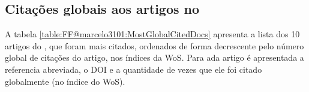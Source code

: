 

\subsection{Citações globais aos artigos no \dataset}

A tabela \ref{table:FF@marcelo3101:MostGlobalCitedDocs} apresenta a lista dos 10 artigos do \dataset, que foram mais citados, ordenados de forma decrescente pelo número global de citações do artigo, nos índices da WoS. Para ada artigo é apresentada a referencia abreviada, o DOI e a quantidade de vezes que ele foi citado globalmente (no índice do WoS).

